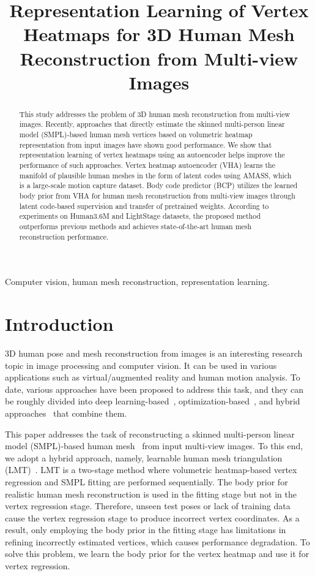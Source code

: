 \documentclass{article}
\title{Representation Learning of Vertex Heatmaps for 3D Human Mesh Reconstruction from Multi-view Images}
\begin{document}
\maketitle
\begin{abstract}
This study addresses the problem of 3D human mesh reconstruction from multi-view images. Recently, approaches that directly estimate the skinned multi-person linear model (SMPL)-based human mesh vertices based on volumetric heatmap representation from input images have shown good performance. We show that representation learning of vertex heatmaps using an autoencoder helps improve the performance of such approaches. Vertex heatmap autoencoder (VHA) learns the manifold of plausible human meshes in the form of latent codes using AMASS, which is a large-scale motion capture dataset. Body code predictor (BCP) utilizes the learned body prior from VHA for human mesh reconstruction from multi-view images through latent code-based supervision and transfer of pretrained weights. According to experiments on Human3.6M and LightStage datasets, the proposed method outperforms previous methods and achieves state-of-the-art human mesh reconstruction performance.
\end{abstract}
\begin{keywords}
Computer vision, human mesh reconstruction, representation learning.
\end{keywords}



\section{Introduction}
\label{sec:intro}

3D human pose and mesh reconstruction from images is an interesting research topic in image processing and computer vision. It can be used in various applications such as virtual/augmented reality and human motion analysis. To date, various approaches have been proposed to address this task, and they can be roughly divided into deep learning-based~\cite{2018_Kanazawa, 2020_Shin, choi2022learning}, optimization-based~\cite{SMPLify_X_2019_Pavlakos, Bogo_ECCV_2016}, and hybrid approaches~\cite{Chun_2023_WACV, lightcap2021} that combine them.

This paper addresses the task of reconstructing a skinned multi-person linear model (SMPL)-based human mesh~\cite{2015_SMPL} from input multi-view images. To this end, we adopt a hybrid approach, namely, learnable human mesh triangulation (LMT)~\cite{Chun_2023_WACV}. LMT is a two-stage method where volumetric heatmap-based vertex regression and SMPL fitting are performed sequentially. The body prior for realistic human mesh reconstruction is used in the fitting stage but not in the vertex regression stage. Therefore, unseen test poses or lack of training data cause the vertex regression stage to produce incorrect vertex coordinates. As a result, only employing the body prior in the fitting stage has limitations in refining incorrectly estimated vertices, which causes performance degradation. To solve this problem, we learn the body prior for the vertex heatmap and use it for vertex regression. 
\end{document}
